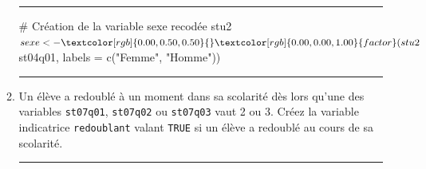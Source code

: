 \documentclass[12pt,twosided, notitlepage]{book}
\newenvironment{Shaded}{}{}
\newcommand{\CommentTok}[1]{\textcolor[rgb]{0.00,0.50,0.00}{#1}}
\newcommand{\DataTypeTok}[1]{#1}
\newcommand{\DecValTok}[1]{#1}
\newcommand{\KeywordTok}[1]{\textcolor[rgb]{0.00,0.00,1.00}{#1}}
\newcommand{\NormalTok}[1]{#1}
\newcommand{\OperatorTok}[1]{#1}
\newcommand{\StringTok}[1]{\textcolor[rgb]{0.00,0.50,0.50}{#1}}
\newif \ifsol
\renewenvironment{Shaded}{\begin{snugshade}}{\end{snugshade}}
\begin{document}
\begin{enumerate}
\begin{enumerate}
    \begin{center} \rule{0.5\linewidth}{\linethickness}\end{center}

\begin{Shaded}
\begin{Highlighting}[]
\CommentTok{# Création de la variable sexe recodée}
\NormalTok{stu2}\OperatorTok{$}\NormalTok{sexe <-}\StringTok{ }\KeywordTok{factor}\NormalTok{(stu2}\OperatorTok{$}\NormalTok{st04q01, }\DataTypeTok{labels =} \KeywordTok{c}\NormalTok{(}\StringTok{"Femme"}\NormalTok{, }\StringTok{"Homme"}\NormalTok{))}
\end{Highlighting}
\end{Shaded}

    \begin{center} \rule{0.5\linewidth}{\linethickness}\end{center} 
      \bigskip 
      \fi
  \item
    Un élève a redoublé à un moment dans sa scolarité dès lors qu'une
    des variables \texttt{st07q01}, \texttt{st07q02} ou \texttt{st07q03}
    vaut 2 ou 3. Créez la variable indicatrice \texttt{redoublant}
    valant \texttt{TRUE} si un élève a redoublé au cours de sa
    scolarité.

    \ifsol 
     \begin{center} \rule{0.5\linewidth}{\linethickness}\end{center}

\begin{Shaded}
\end{Shaded}


\end{enumerate}
\end{enumerate}
\end{document}
